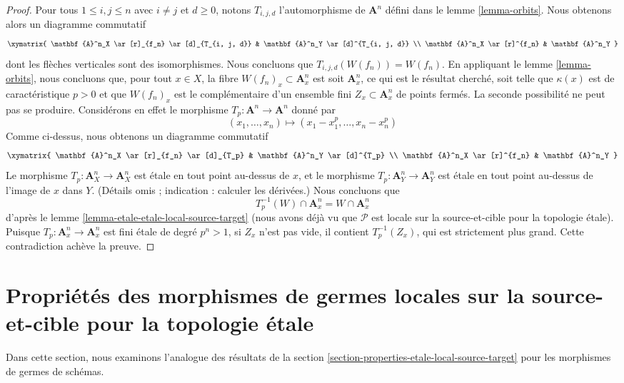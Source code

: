 \begin{proof}
\medskip\noindent
Pour tous $1 \leq i, j \leq n$ avec $i \not = j$ et $d \geq 0$, notons
$T_{i, j, d}$ l'automorphisme de $\mathbf{A}^n$ défini dans le
lemme \ref{lemma-orbits}. Nous obtenons alors un diagramme commutatif
$$
\xymatrix{
\mathbf{A}^n_X \ar[r]_{f_n} \ar[d]_{T_{i, j, d}} &
\mathbf{A}^n_Y \ar[d]^{T_{i, j, d}} \\
\mathbf{A}^n_X \ar[r]^{f_n} & \mathbf{A}^n_Y
}
$$
dont les flèches verticales sont des isomorphismes. Nous concluons que
$T_{i, j, d}(W(f_n)) = W(f_n)$. En appliquant le lemme \ref{lemma-orbits}, nous
concluons que, pour tout $x \in X$, la fibre
$W(f_n)_x \subset \mathbf{A}^n_x$ est soit $\mathbf{A}^n_x$, ce qui est le
résultat cherché, soit telle que $\kappa(x)$ est de caractéristique $p > 0$ et
que $W(f_n)_x$ est le complémentaire d'un ensemble fini
$Z_x \subset \mathbf{A}^n_x$ de points fermés. La seconde possibilité ne peut
pas se produire. Considérons en effet le morphisme
$T_p : \mathbf{A}^n \to \mathbf{A}^n$ donné par
$$
(x_1, \ldots, x_n) \mapsto (x_1 - x_1^p, \ldots, x_n - x_n^p)
$$
Comme ci-dessus, nous obtenons un diagramme commutatif
$$
\xymatrix{
\mathbf{A}^n_X \ar[r]_{f_n} \ar[d]_{T_p} &
\mathbf{A}^n_Y \ar[d]^{T_p} \\
\mathbf{A}^n_X \ar[r]^{f_n} & \mathbf{A}^n_Y
}
$$
Le morphisme $T_p : \mathbf{A}^n_X \to \mathbf{A}^n_X$ est \'etale en tout
point au-dessus de $x$, et le morphisme
$T_p : \mathbf{A}^n_Y \to \mathbf{A}^n_Y$ est \'etale en tout point au-dessus
de l'image de $x$ dans $Y$. (Détails omis ; indication : calculer les
dérivées.) Nous concluons que
$$
T_p^{-1}(W) \cap \mathbf{A}^n_x = W \cap \mathbf{A}^n_x
$$
d'après le lemme \ref{lemma-etale-etale-local-source-target} (nous avons déjà
vu que $\mathcal{P}$ est locale sur la source-et-cible pour la topologie
\'etale). Puisque $T_p : \mathbf{A}^n_x \to \mathbf{A}^n_x$ est fini \'etale de
degré $p^n > 1$, si $Z_x$ n'est pas vide, il contient $T_p^{-1}(Z_x)$, qui est
strictement plus grand. Cette contradiction achève la preuve.
\end{proof}





\section[Morphismes de germes : localité étale]{Propriétés des morphismes de germes locales sur la source-et-cible
pour la topologie étale}
\label{section-local-source-target-at-point}

\noindent
Dans cette section, nous examinons l'analogue des résultats de la
section \ref{section-properties-etale-local-source-target}
pour les morphismes de germes de schémas.


